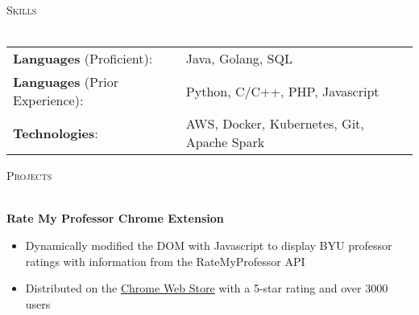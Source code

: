 \documentclass[letterpaper]{article}
\newcommand{\lineunder} {
    \vspace*{-8pt} \\
    \hspace*{-18pt} \hrulefill \\
}
\newcommand{\header} [1] {
    {\hspace*{-18pt}\vspace*{6pt} \textsc{#1}}
    \vspace*{-6pt} \lineunder
    \vspace{1mm}
}
\begin{document}
\header{Skills}

\begin{tabular}{ l l}
    \vspace{2mm}
	\textbf{Languages} (Proficient): & Java, Golang, SQL \\
    \vspace{2mm}
    \textbf{Languages} (Prior Experience):& Python, C/C++, PHP, Javascript \\
	\textbf{Technologies}: & AWS, Docker, Kubernetes, Git, Apache Spark  \\
\end{tabular}
\vspace{2mm}

\header{Projects}

\textbf{Rate My Professor Chrome Extension} \\
\vspace{-1mm}
\begin{itemize} \itemsep 1pt
	\item Dynamically modified the DOM with Javascript to display BYU professor ratings with information from the RateMyProfessor API
	\item Distributed on the \href{https://chrome.google.com/webstore/detail/rate-my-byu-professors/ghokpcnkghnkfofadiajmmhinooijmaf}{Chrome Web Store} with a 5-star rating and over 3000 users
\end{itemize}
\vspace*{2mm}

\ 
\end{document}
